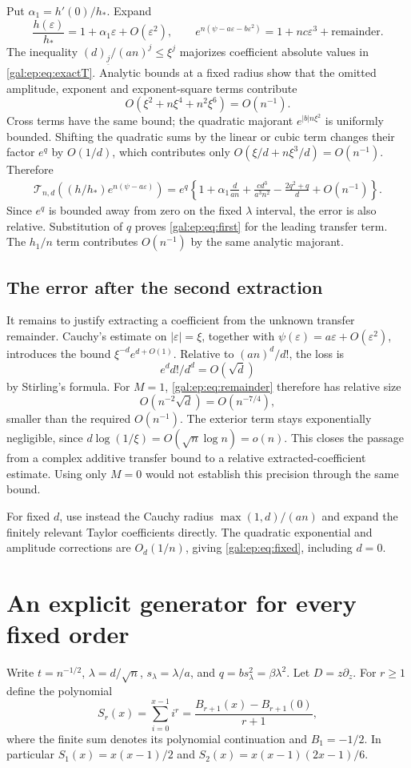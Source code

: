 \documentclass[11pt,letterpaper]{article}
\numberwithin{equation}{section}
\theoremstyle{definition}\newtheorem{definition}[theorem]{Definition}
\theoremstyle{remark}\newtheorem{remark}[theorem]{Remark}
\newcommand{\eps}{\varepsilon}
\newcommand{\fall}[2]{(#1)_{\underline{#2}}}
\begin{document}
Put $\alpha_1=h'(0)/h_*$. Expand
\[
\frac{h(\eps)}{h_*}=1+\alpha_1\eps+O(\eps^2),\qquad
 e^{n(\psi-a\eps-b\eps^2)}=1+nc\eps^3+\text{remainder}.
\]
The inequality $\fall d j/(an)^j\le\xi^j$ majorizes coefficient absolute values in \eqref{gal:ep:eq:exactT}. Analytic bounds at a fixed radius show that the omitted amplitude, exponent and exponent-square terms contribute
\[
O(\xi^2+n\xi^4+n^2\xi^6)=O(n^{-1}).
\]
Cross terms have the same bound; the quadratic majorant $e^{|b|n\xi^2}$ is uniformly bounded. Shifting the quadratic sums by the linear or cubic term changes their factor $e^q$ by $O(1/d)$, which contributes only $O(\xi/d+n\xi^3/d)=O(n^{-1})$. Therefore
\begin{align}\label{gal:ep:eq:extractedfirst}
\mathcal T_{n,d}\!\left((h/h_*)e^{n(\psi-a\eps)}\right)
=e^q\left\{1+\alpha_1\frac d{an}+\frac{cd^3}{a^3n^2}
-\frac{2q^2+q}{d}+O(n^{-1})\right\}.
\end{align}
Since $e^q$ is bounded away from zero on the fixed $\lambda$ interval, the error is also relative. Substitution of $q$ proves \eqref{gal:ep:eq:first} for the leading transfer term. The $h_1/n$ term contributes $O(n^{-1})$ by the same analytic majorant.

\subsection{The error after the second extraction}
It remains to justify extracting a coefficient from the unknown transfer remainder. Cauchy's estimate on $|\eps|=\xi$, together with $\psi(\eps)=a\eps+O(\eps^2)$, introduces the bound $\xi^{-d}e^{d+O(1)}$. Relative to $(an)^d/d!$, the loss is
\[
e^d d!/d^d=O(\sqrt d)
\]
by Stirling's formula. For $M=1$, \eqref{gal:ep:eq:remainder} therefore has relative size
\[
O(n^{-2}\sqrt d)=O(n^{-7/4}),
\]
smaller than the required $O(n^{-1})$. The exterior term stays exponentially negligible, since $d\log(1/\xi)=O(\sqrt n\log n)=o(n)$. This closes the passage from a complex additive transfer bound to a relative extracted-coefficient estimate. Using only $M=0$ would not establish this precision through the same bound.

For fixed $d$, use instead the Cauchy radius $\max(1,d)/(an)$ and expand the finitely relevant Taylor coefficients directly. The quadratic exponential and amplitude corrections are $O_d(1/n)$, giving \eqref{gal:ep:eq:fixed}, including $d=0$.

\section{An explicit generator for every fixed order}\label{gal:ep:sec:generator}
Write $t=n^{-1/2}$, $\lambda=d/\sqrt n$, $s_\lambda=\lambda/a$, and $q=bs_\lambda^2=\beta\lambda^2$. Let $D=z\partial_z$. For $r\ge1$ define the polynomial
\[
S_r(x)=\sum_{i=0}^{x-1}i^r
=\frac{B_{r+1}(x)-B_{r+1}(0)}{r+1},
\]
where the finite sum denotes its polynomial continuation and $B_1=-1/2$. In particular $S_1(x)=x(x-1)/2$ and $S_2(x)=x(x-1)(2x-1)/6$.
\end{document}
